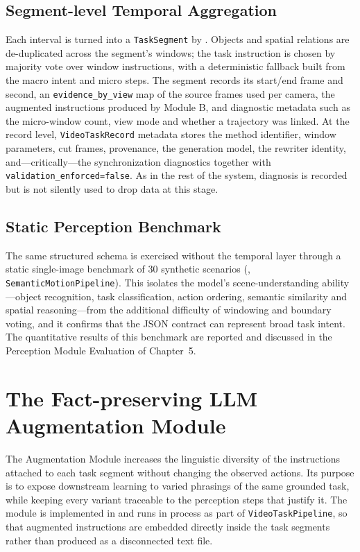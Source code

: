 \documentclass[11pt,oneside]{report}
\begin{document}
\subsection{Segment-level Temporal Aggregation}
Each interval is turned into a \texttt{TaskSegment} by
. Objects and spatial relations are
de-duplicated across the segment's windows; the task instruction is chosen by
majority vote over window instructions, with a deterministic fallback built from
the macro intent and micro steps. The segment records its start/end frame and
second, an \texttt{evidence\_by\_view} map of the source frames used per camera,
the augmented instructions produced by Module B, and diagnostic metadata such as
the micro-window count, view mode and whether a trajectory was linked. At the
record level, \texttt{VideoTaskRecord} metadata stores the method identifier,
window parameters, cut frames, provenance, the generation model, the rewriter
identity, and---critically---the synchronization diagnostics together with
\texttt{validation\_enforced=false}. As in the rest of the system, diagnosis is
recorded but is not silently used to drop data at this stage.

\subsection{Static Perception Benchmark}
The same structured schema is exercised without the temporal layer through a
static single-image benchmark of $30$ synthetic scenarios
(, \texttt{SemanticMotionPipeline}). This isolates the
model's scene-understanding ability---object recognition, task classification,
action ordering, semantic similarity and spatial reasoning---from the additional
difficulty of windowing and boundary voting, and it confirms that the JSON
contract can represent broad task intent. The quantitative results of this
benchmark are reported and discussed in the Perception Module Evaluation of
Chapter~5.

\section{The Fact-preserving LLM Augmentation Module}
The Augmentation Module increases the linguistic diversity of the instructions
attached to each task segment without changing the observed actions. Its purpose
is to expose downstream learning to varied phrasings of the same grounded task,
while keeping every variant traceable to the perception steps that justify it.
The module is implemented in  and
runs in process as part of \texttt{VideoTaskPipeline}, so that augmented
instructions are embedded directly inside the task segments rather than produced
as a disconnected text file.
\end{document}
